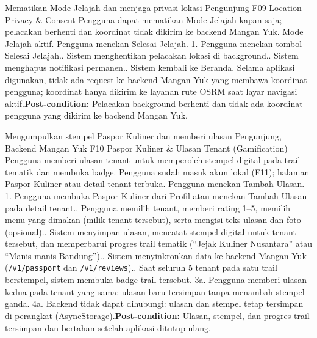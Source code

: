 {Mematikan Mode Jelajah dan menjaga privasi lokasi}
{Pengunjung}
{F09 Location Privacy \& Consent}
{Pengguna dapat mematikan Mode Jelajah kapan saja; pelacakan berhenti dan koordinat tidak dikirim ke backend Mangan Yuk.}
{Mode Jelajah aktif.}
{Pengguna menekan Selesai Jelajah.}
{1. Pengguna menekan tombol Selesai Jelajah.. Sistem menghentikan pelacakan lokasi di background.. Sistem menghapus notifikasi permanen.. Sistem kembali ke Beranda.}
{Selama aplikasi digunakan, tidak ada request ke backend Mangan Yuk yang membawa koordinat pengguna; koordinat hanya dikirim ke layanan rute OSRM saat layar navigasi aktif.\newline\textbf{Post-condition:} Pelacakan background berhenti dan tidak ada koordinat pengguna yang dikirim ke backend Mangan Yuk.}

{Mengumpulkan stempel Paspor Kuliner dan memberi ulasan}
{Pengunjung, Backend Mangan Yuk}
{F10 Paspor Kuliner \& Ulasan Tenant (Gamification)}
{Pengguna memberi ulasan tenant untuk memperoleh stempel digital pada trail tematik dan membuka badge.}
{Pengguna sudah masuk akun lokal (F11); halaman Paspor Kuliner atau detail tenant terbuka.}
{Pengguna menekan Tambah Ulasan.}
{1. Pengguna membuka Paspor Kuliner dari Profil atau menekan Tambah Ulasan pada detail tenant.. Pengguna memilih tenant, memberi rating 1--5, memilih menu yang dimakan (milik tenant tersebut), serta mengisi teks ulasan dan foto (opsional).. Sistem menyimpan ulasan, mencatat stempel digital untuk tenant tersebut, dan memperbarui progres trail tematik (``Jejak Kuliner Nusantara'' atau ``Manis-manis Bandung'').. Sistem menyinkronkan data ke backend Mangan Yuk (\texttt{/v1/passport} dan \texttt{/v1/reviews}).. Saat seluruh 5 tenant pada satu trail berstempel, sistem membuka badge trail tersebut.}
{3a. Pengguna memberi ulasan kedua pada tenant yang sama: ulasan baru tersimpan tanpa menambah stempel ganda.\newline
4a. Backend tidak dapat dihubungi: ulasan dan stempel tetap tersimpan di perangkat (AsyncStorage).\newline\textbf{Post-condition:} Ulasan, stempel, dan progres trail tersimpan dan bertahan setelah aplikasi ditutup ulang.}

